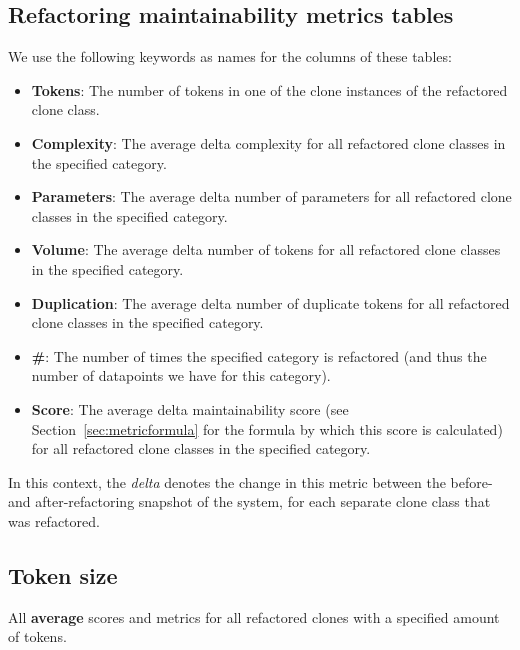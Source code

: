 \begin{appendices}

	\chapter{Refactoring maintainability metrics tables}

	We use the following keywords as names for the columns of these tables:
	\begin{itemize}
		\item \textbf{Tokens}: The number of tokens in one of the clone instances of the refactored clone class.
		\item \textbf{Complexity}: The average delta complexity for all refactored clone classes in the specified category.
		\item \textbf{Parameters}: The average delta number of parameters for all refactored clone classes in the specified category.
		\item \textbf{Volume}: The average delta number of tokens for all refactored clone classes in the specified category.
		\item \textbf{Duplication}: The average delta number of duplicate tokens for all refactored clone classes in the specified category.
		\item \textbf{\#}: The number of times the specified category is refactored (and thus the number of datapoints we have for this category).
		\item \textbf{Score}: The average delta maintainability score (see Section~\ref{sec:metricformula} for the formula by which this score is calculated) for all refactored clone classes in the specified category.
	\end{itemize}
	In this context, the \textit{delta} denotes the change in this metric between the before- and after-refactoring snapshot of the system, for each separate clone class that was refactored.

	\section{Token size}
All \textbf{average} scores and metrics for all refactored clones with a specified amount of tokens.


\end{appendices}
